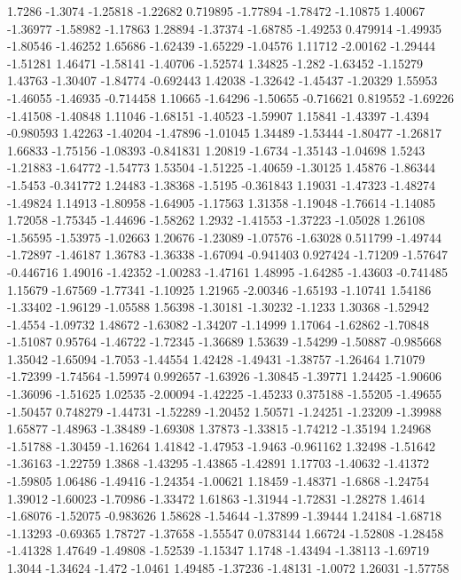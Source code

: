 \documentclass[9pt]{article}
\theoremstyle{plain}
\theoremstyle{definition}
\theoremstyle{remark}
\numberwithin{equation}{section}
\begin{document}
1.7286
-1.3074
-1.25818
-1.22682
0.719895
-1.77894
-1.78472
-1.10875
1.40067
-1.36977
-1.58982
-1.17863
1.28894
-1.37374
-1.68785
-1.49253
0.479914
-1.49935
-1.80546
-1.46252
1.65686
-1.62439
-1.65229
-1.04576
1.11712
-2.00162
-1.29444
-1.51281
1.46471
-1.58141
-1.40706
-1.52574
1.34825
-1.282
-1.63452
-1.15279
1.43763
-1.30407
-1.84774
-0.692443
1.42038
-1.32642
-1.45437
-1.20329
1.55953
-1.46055
-1.46935
-0.714458
1.10665
-1.64296
-1.50655
-0.716621
0.819552
-1.69226
-1.41508
-1.40848
1.11046
-1.68151
-1.40523
-1.59907
1.15841
-1.43397
-1.4394
-0.980593
1.42263
-1.40204
-1.47896
-1.01045
1.34489
-1.53444
-1.80477
-1.26817
1.66833
-1.75156
-1.08393
-0.841831
1.20819
-1.6734
-1.35143
-1.04698
1.5243
-1.21883
-1.64772
-1.54773
1.53504
-1.51225
-1.40659
-1.30125
1.45876
-1.86344
-1.5453
-0.341772
1.24483
-1.38368
-1.5195
-0.361843
1.19031
-1.47323
-1.48274
-1.49824
1.14913
-1.80958
-1.64905
-1.17563
1.31358
-1.19048
-1.76614
-1.14085
1.72058
-1.75345
-1.44696
-1.58262
1.2932
-1.41553
-1.37223
-1.05028
1.26108
-1.56595
-1.53975
-1.02663
1.20676
-1.23089
-1.07576
-1.63028
0.511799
-1.49744
-1.72897
-1.46187
1.36783
-1.36338
-1.67094
-0.941403
0.927424
-1.71209
-1.57647
-0.446716
1.49016
-1.42352
-1.00283
-1.47161
1.48995
-1.64285
-1.43603
-0.741485
1.15679
-1.67569
-1.77341
-1.10925
1.21965
-2.00346
-1.65193
-1.10741
1.54186
-1.33402
-1.96129
-1.05588
1.56398
-1.30181
-1.30232
-1.1233
1.30368
-1.52942
-1.4554
-1.09732
1.48672
-1.63082
-1.34207
-1.14999
1.17064
-1.62862
-1.70848
-1.51087
0.95764
-1.46722
-1.72345
-1.36689
1.53639
-1.54299
-1.50887
-0.985668
1.35042
-1.65094
-1.7053
-1.44554
1.42428
-1.49431
-1.38757
-1.26464
1.71079
-1.72399
-1.74564
-1.59974
0.992657
-1.63926
-1.30845
-1.39771
1.24425
-1.90606
-1.36096
-1.51625
1.02535
-2.00094
-1.42225
-1.45233
0.375188
-1.55205
-1.49655
-1.50457
0.748279
-1.44731
-1.52289
-1.20452
1.50571
-1.24251
-1.23209
-1.39988
1.65877
-1.48963
-1.38489
-1.69308
1.37873
-1.33815
-1.74212
-1.35194
1.24968
-1.51788
-1.30459
-1.16264
1.41842
-1.47953
-1.9463
-0.961162
1.32498
-1.51642
-1.36163
-1.22759
1.3868
-1.43295
-1.43865
-1.42891
1.17703
-1.40632
-1.41372
-1.59805
1.06486
-1.49416
-1.24354
-1.00621
1.18459
-1.48371
-1.6868
-1.24754
1.39012
-1.60023
-1.70986
-1.33472
1.61863
-1.31944
-1.72831
-1.28278
1.4614
-1.68076
-1.52075
-0.983626
1.58628
-1.54644
-1.37899
-1.39444
1.24184
-1.68718
-1.13293
-0.69365
1.78727
-1.37658
-1.55547
0.0783144
1.66724
-1.52808
-1.28458
-1.41328
1.47649
-1.49808
-1.52539
-1.15347
1.1748
-1.43494
-1.38113
-1.69719
1.3044
-1.34624
-1.472
-1.0461
1.49485
-1.37236
-1.48131
-1.0072
1.26031
-1.57758
\end{document}
